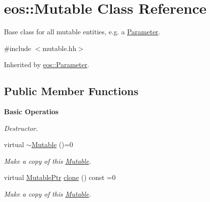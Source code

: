 \hypertarget{classeos_1_1Mutable}{
\section{eos::Mutable Class Reference}
\label{classeos_1_1Mutable}
}


Base class for all mutable entities, e.g. a \hyperlink{classeos_1_1Parameter}{Parameter}.  


{\ttfamily \#include $<$mutable.hh$>$}

Inherited by \hyperlink{classeos_1_1Parameter}{eos::Parameter}.\subsection*{Public Member Functions}
\begin{Indent}{\bf Basic Operatios}\par
{\em \label{_amgrpe14f7e6d89bed7e26b8b7aa00881ccfd}
 Destructor. }\begin{DoxyCompactItemize}
\item 
virtual \hyperlink{classeos_1_1Mutable_a928ec6648a438f02b6369a8863d39560}{$\sim$Mutable} ()=0
\begin{DoxyCompactList}\small\item\em Make a copy of this \hyperlink{classeos_1_1Mutable}{Mutable}. \item\end{DoxyCompactList}\item 
virtual \hyperlink{namespaceeos_a0ab446e6a801d96a1ee83bb7c070686f}{MutablePtr} \hyperlink{classeos_1_1Mutable_a31d51dbb25d02ad989592b43de8a787b}{clone} () const =0
\begin{DoxyCompactList}\small\item\em Make a copy of this \hyperlink{classeos_1_1Mutable}{Mutable}. \item\end{DoxyCompactList}\end{DoxyCompactItemize}
\end{Indent}
